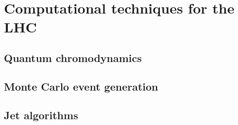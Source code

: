 
\chapter{Computational techniques for the LHC}
\label{chap:tools}

\section{Quantum chromodynamics}
	\label{sec:qcd}
	
\section{Monte Carlo event generation}
	\label{sec:mc}
	
\section{Jet algorithms}
	\label{sec:jets}
	



